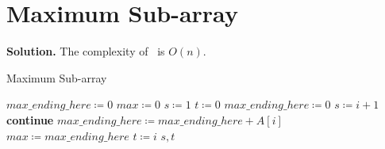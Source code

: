\documentclass{../../cls/sig-alternate-05-2015}
\begin{document}
\section{Maximum Sub-array}
\textbf{Solution.} The complexity of~ is $O(n)$.
\begin{algorithm}[H]
    \caption{Maximum Sub-array}
    \label{a:5}
    \begin{algorithmic}
        \State $max\_ending\_here \coloneqq 0$
        \State $max \coloneqq 0$
        \State $s \coloneqq 1$
        \State $t \coloneqq 0$
        \State $max\_ending\_here \coloneqq 0$
        \State $s \coloneqq i + 1$
        \State \textbf{continue}
        \EndIf
        \State $max\_ending\_here \coloneqq max\_ending\_here + A[i]$
        \State $max \coloneqq max\_ending\_here$
        \State $t \coloneqq i$
        \EndIf
        \EndFor
        \State \Return $s, t$
        \EndProcedure
    \end{algorithmic}
\end{algorithm}
\end{document}
